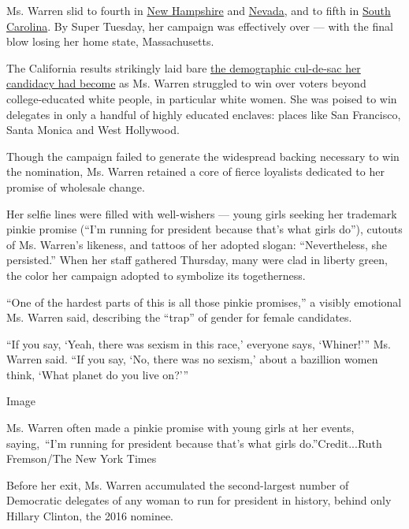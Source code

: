 Ms. Warren slid to fourth in
\href{https://www.nytimes.com/interactive/2020/02/11/us/elections/results-new-hampshire-primary-election.html}{New
Hampshire} and
\href{https://www.nytimes.com/interactive/2020/02/22/us/elections/results-nevada-caucus.html}{Nevada},
and to fifth in
\href{https://www.nytimes.com/interactive/2020/02/29/us/elections/results-south-carolina-primary-election.html}{South
Carolina}. By Super Tuesday, her campaign was effectively over --- with
the final blow losing her home state, Massachusetts.

The California results strikingly laid bare
\href{https://www.nytimes.com/2020/03/03/us/politics/elizabeth-warren-super-tuesday.html}{the
demographic cul-de-sac her candidacy had become} as Ms. Warren struggled
to win over voters beyond college-educated white people, in particular
white women. She was poised to win delegates in only a handful of highly
educated enclaves: places like San Francisco, Santa Monica and West
Hollywood.

Though the campaign failed to generate the widespread backing necessary
to win the nomination, Ms. Warren retained a core of fierce loyalists
dedicated to her promise of wholesale change.

Her selfie lines were filled with well-wishers --- young girls seeking
her trademark pinkie promise (``I'm running for president because that's
what girls do''), cutouts of Ms. Warren's likeness, and tattoos of her
adopted slogan: ``Nevertheless, she persisted.'' When her staff gathered
Thursday, many were clad in liberty green, the color her campaign
adopted to symbolize its togetherness.

``One of the hardest parts of this is all those pinkie promises,'' a
visibly emotional Ms. Warren said, describing the ``trap'' of gender for
female candidates.

``If you say, `Yeah, there was sexism in this race,' everyone says,
`Whiner!''' Ms. Warren said. ``If you say, `No, there was no sexism,'
about a bazillion women think, `What planet do you live on?'''

Image

Ms. Warren often made a pinkie promise with young girls at her events,
saying,~``I'm running for president because that's what girls
do.''Credit...Ruth Fremson/The New York Times

Before her exit, Ms. Warren accumulated the second-largest number of
Democratic delegates of any woman to run for president in history,
behind only Hillary Clinton, the 2016 nominee.

